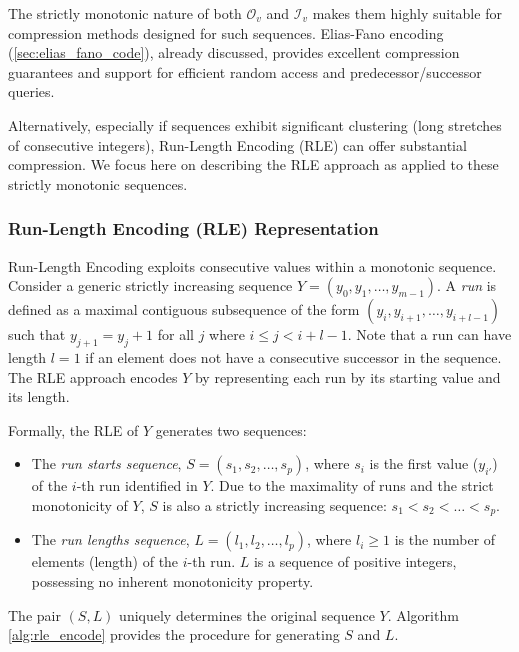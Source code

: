 The strictly monotonic nature of both $\mathcal{O}_v$ and $\mathcal{I}_v$ makes them highly suitable for compression methods designed for such sequences. Elias-Fano encoding (\autoref{sec:elias_fano_code}), already discussed, provides excellent compression guarantees and support for efficient random access and predecessor/successor queries.

Alternatively, especially if sequences exhibit significant clustering (long stretches of consecutive integers), Run-Length Encoding (RLE) can offer substantial compression. We focus here on describing the RLE approach as applied to these strictly monotonic sequences.

\subsubsection*{Run-Length Encoding (RLE) Representation}

Run-Length Encoding exploits consecutive values within a monotonic sequence. Consider a generic strictly increasing sequence $Y = (y_0, y_1, \dots, y_{m-1})$. A \emph{run} is defined as a maximal contiguous subsequence of the form $(y_i, y_{i+1}, \dots, y_{i+l-1})$ such that $y_{j+1} = y_j + 1$ for all $j$ where $i \le j < i+l-1$. Note that a run can have length $l=1$ if an element does not have a consecutive successor in the sequence. The RLE approach encodes $Y$ by representing each run by its starting value and its length.

Formally, the RLE of $Y$ generates two sequences:
\begin{itemize}
    \item The \emph{run starts sequence}, $S = (s_1, s_2, \dots, s_p)$, where $s_i$ is the first value ($y_{i'}$) of the $i$-th run identified in $Y$. Due to the maximality of runs and the strict monotonicity of $Y$, $S$ is also a strictly increasing sequence: $s_1 < s_2 < \dots < s_p$.
    \item The \emph{run lengths sequence}, $L = (l_1, l_2, \dots, l_p)$, where $l_i \ge 1$ is the number of elements (length) of the $i$-th run. $L$ is a sequence of positive integers, possessing no inherent monotonicity property.
\end{itemize}
The pair $(S, L)$ uniquely determines the original sequence $Y$. Algorithm \ref{alg:rle_encode} provides the procedure for generating $S$ and $L$.

